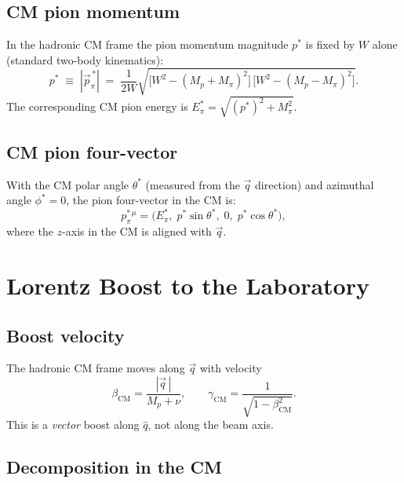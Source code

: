 \documentclass[12pt,a4paper]{article}
\begin{document}
\subsection{CM pion momentum}

In the hadronic CM frame the pion momentum magnitude $p^*$ is fixed by $W$
alone (standard two-body kinematics):
\begin{equation}
  \boxed{
  p^* \;\equiv\; |\vec{p}_\pi^{\,*}|
     \;=\; \frac{1}{2W}
       \sqrt{\bigl[W^2 - (M_p + M_\pi)^2\bigr]\,\bigl[W^2 - (M_p - M_\pi)^2\bigr]}.
  }
  \label{eq:pstar}
\end{equation}
The corresponding CM pion energy is $E_\pi^* = \sqrt{(p^*)^2 + M_\pi^2}$.

\subsection{CM pion four-vector}

With the CM polar angle $\theta^*$ (measured from the $\vec{q}$ direction)
and azimuthal angle $\phi^* = 0$, the pion four-vector in the CM is:
\begin{equation}
  p_\pi^{*\,\mu} = \bigl(E_\pi^*,\; p^* \sin\theta^*,\; 0,\; p^* \cos\theta^*\bigr),
  \label{eq:piCM}
\end{equation}
where the $z$-axis in the CM is aligned with $\vec{q}$.

\section{Lorentz Boost to the Laboratory}

\subsection{Boost velocity}

The hadronic CM frame moves along $\vec{q}$ with velocity
\begin{equation}
  \beta_\text{CM} = \frac{|\vec{q}\,|}{M_p + \nu},
  \qquad
  \gamma_\text{CM} = \frac{1}{\sqrt{1 - \beta_\text{CM}^2}}.
  \label{eq:betaCM}
\end{equation}
This is a \emph{vector} boost along $\hat{q}$, not along the beam axis.

\subsection{Decomposition in the CM}
\end{document}
